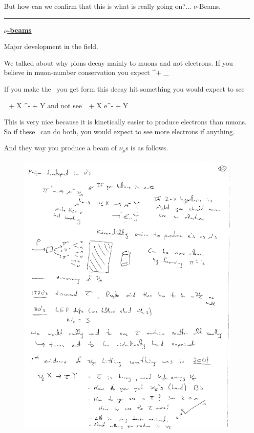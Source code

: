 {But how can we confirm that this is what is really going on?... $\nu$-Beams.

\noindent\rule{\textwidth}{1pt}

\textbf{\underline{$\nu$-beams} }

Major development in the field.

We talked about why pions decay mainly to muons and not electrons. 
If you believe in muon-number conservation you expect
\be 
\pi \rightarrow \mu^+ \nu_\mu
\ee 

If you make the \nus\ you get form this decay hit something you would expect to see

\be
\nu_\mu + X \rightarrow \mu^- + Y
\ee
and not see
\be
\nu_\mu + X \rightarrow e^- + Y
\ee

This is very nice because it is kinetically easier to produce electrons than muons. 
So if these \nus\ can do both, you would expect to see more electrons if anything. 

And they way you produce a beam of $\nu_\mu$s is as follows.

\begin{figure}[h!]
\centering
\includegraphics[width=1.0\textwidth]{./NuBeam.pdf}
\end{figure}

}
